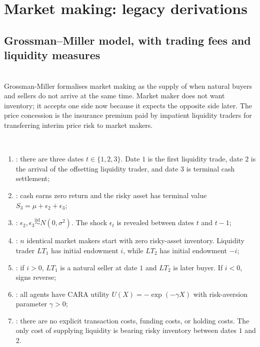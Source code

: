 \documentclass[a4paper,oneside,openany]{book}
\begin{document}
\chapter*{Market making: legacy derivations}

\section*{Grossman--Miller model, with trading fees and liquidity measures}

\begin{model}  \citep{grossman-miller-1988}\\
Grossman-Miller formalises market making as the supply of  when natural buyers and sellers do not arrive at the same time. Market maker does not want inventory; it accepts one side now because it expects the opposite side later. The price concession is the insurance premium paid by impatient liquidity traders for transferring interim price risk to market makers.

\par\smallskip\noindent{}\\
\begin{enumerate}[label=\roman*.]
\setlength{\itemsep}{0pt}
\item {}: there are three dates $t\in\{1,2,3\}$. Date $1$ is the first liquidity trade, date $2$ is the arrival of the offsetting liquidity trader, and date $3$ is terminal cash settlement;
\item {}: cash earns zero return and the risky asset has terminal value $S_3=\mu+\epsilon_2+\epsilon_3$;
\item {}: $\epsilon_2,\epsilon_3\overset{\text{iid}}{\sim}N(0,\sigma^2)$. The shock $\epsilon_{t}$ is revealed between dates $t$ and $t-1$;
\item {}: $n$ identical market makers start with zero risky-asset inventory. Liquidity trader $LT_1$ has initial endowment $i$, while $LT_2$ has initial endowment $-i$;
\item {}: if $i>0$, $LT_1$ is a natural seller at date $1$ and $LT_2$ is later buyer. If $i<0$, signs reverse;
\item {}: all agents have CARA utility $U(X)=-\exp(-\gamma X)$ with risk-aversion parameter $\gamma>0$;
\item {}: there are no explicit transaction costs, funding costs, or holding costs. The only cost of supplying liquidity is bearing risky inventory between dates $1$ and $2$.
\end{enumerate}


\end{model}
\end{document}
